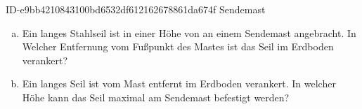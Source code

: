 \begin{exercise}
      {ID-e9bb4210843100bd6532df612162678861da674f}
      {Sendemast}
  \ifproblem\problem
    \begin{enumerate}[a)]
      \item Ein  langes Stahlseil ist in einer Höhe von 
            an einem Sendemast angebracht. In Welcher Entfernung vom Fußpunkt des
            Mastes ist das Seil im Erdboden verankert?
      \item Ein  langes Seil ist  vom Mast entfernt im
            Erdboden verankert. In welcher Höhe kann das Seil maximal am Sendemast
            befestigt werden?
    \end{enumerate}
  \fi
\end{exercise}
